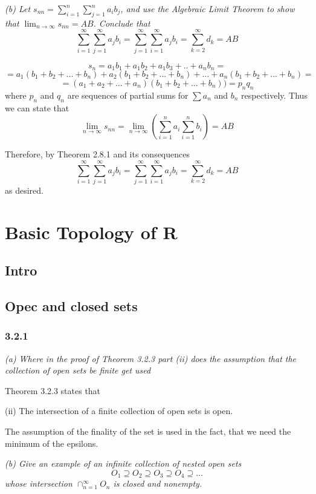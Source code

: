 \documentclass[11pt,oneside,titlepage]{book}
\begin{document}
\textit{(b) Let $s_{nn} = \sum_{i = 1}^n\sum_{j = 1}^n a_i b_j$, and use the
  Algebraic Limit Theorem to show that $\lim_{n \to \infty} s_{nn} = AB$.
  Conclude that }
$$\sum_{i = 1}^{\infty} \sum_{j = 1}^{\infty} a_j b_i =
\sum_{j = 1}^{\infty} \sum_{i = 1}^{\infty} a_j b_i =
\sum_{k = 2}^{\infty}  d_k = AB$$

$$s_n = a_1 b_1 + a_1 b_2 + a_1 b_3 + .. + a_n b_n = $$
$$= a_1 (b_1 + b_2 + ... + b_n) + a_2 (b_1 + b_2 + ... + b_n) + ...
+ a_n(b_1 + b_2 + ... + b_n) = $$
$$= (a_1 + a_2 + ... + a_n)(b_1 + b_2 + ... + b_n)) = p_n q_n$$
where $p_n$ and $q_n$ are sequences of partial sums for $\sum a_n$ and
$b_n$ respectively. Thus we can state that
$$\lim_{n \to \infty} s_{nn} = \lim_{n \to \infty} (\sum_{i = 1}^{n} a_i 
\sum_{i = 1}^{n} b_i) = AB$$

Therefore, by Theorem 2.8.1 and its consequences
$$\sum_{i = 1}^{\infty} \sum_{j = 1}^{\infty} a_j b_i =
\sum_{j = 1}^{\infty} \sum_{i = 1}^{\infty} a_j b_i =
\sum_{k = 2}^{\infty}  d_k = AB$$
as desired.



\chapter{Basic Topology of R}

\section{Intro}

\section{Opec and closed sets}

\subsection*{3.2.1}
\textit{(a) Where in the proof of Theorem 3.2.3 part (ii) does the assumption
  that the collection of open sets be finite get used}

Theorem 3.2.3 states that

(ii) The intersection of a finite collection of open sets is open.

The assumption of the finality of the set is used in the fact, that we need
the minimum of the epsilons.

\textit{(b) Give an example of an infinite collection of nested open sets}
$$ O_1 \supseteq O_2 \supseteq O_3 \supseteq O_4 \supseteq ... $$
\textit{whose intersection $\cap_{n = 1}^{\infty} O_n$ is closed and nonempty.}
\end{document}
